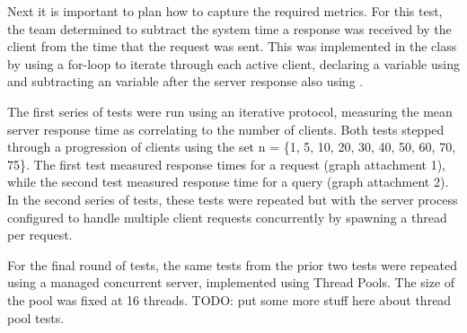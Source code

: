 Next it is important to plan how to capture the required metrics. For this test, the team determined to subtract the system time a response was received by the client from the time that the request was sent. This was implemented in the class  by using a for-loop to iterate through each active client, declaring a  variable using  and subtracting an  variable after the server response also using . 

The first series of tests were run using an iterative protocol, measuring the mean server response time as correlating to the number of clients. Both tests stepped through a progression of clients  using the set  n = \{1, 5, 10, 20, 30, 40, 50, 60, 70, 75\}.  The first test measured response times for a  request (graph attachment 1), while the second test measured response time for a  query (graph attachment 2). In the second series of tests, these tests were repeated but with the server process configured to handle multiple client requests concurrently by spawning a thread per request.

For the final round of tests, the same tests from the prior two tests were repeated using a managed concurrent server, implemented using Thread Pools. The size of the pool was fixed at 16 threads.
TODO: put some more stuff here about thread pool tests.